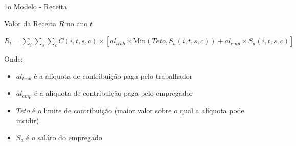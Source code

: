 \begin{frame}{1o Modelo - Receita}
  \begin{block}{Valor da Receita $R$ no ano $t$}
  \scriptsize
      \begin{center}
    $R_t = \sum_i \sum_s \sum_c C(i,t,s,c) \times [al_{trab} \times \text{Min}(Teto, S_a(i,t,s,c)) + al_{emp} \times S_a(i,t,s,c)]$
      \end{center}
  \end{block}
  \scriptsize
    Onde:
    \begin{itemize}
      \item $al_{trab}$ é a alíquota de contribuição paga pelo trabalhador
      \item $al_{emp}$ é a alíquota de contribuição paga pelo empregador
      \item $Teto$ é o limite de contribuição (maior valor sobre o qual a alíquota pode incidir)
      \item $S_a$ é o saláro do empregado
    \end{itemize}
\end{frame}






%
